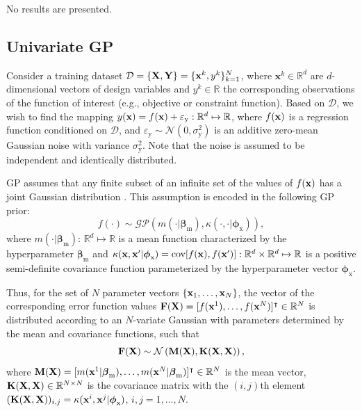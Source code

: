 \documentclass[iicol,sn-basic]{sn-jnl}%
\newcommand{\edit}[1]{\textcolor{red}{#1}} %
\begin{document}
No results are presented.
\begin{appendices}
	
\section{Univariate GP}\label{AppA}
\setcounter{equation}{0} %
\renewcommand{\theequation}{A.\arabic{equation}} %

Consider a training dataset $\mathcal{D}=\left\{ {\bf X},{\bf Y}\right\}=\{{\bf x}^k,y^k\}_{k=1}^N$, where $\textbf{x}^k\in\mathbb{R}^d$ are $d$-dimensional vectors of design variables and $y^k\in\mathbb{R}$ the corresponding observations of the function of interest (e.g., objective or constraint function).
Based on $\mathcal{D}$, we wish to find the mapping $y({\bf x})=f({\bf x}) + \varepsilon_\text{y}: \mathbb{R}^d \mapsto \mathbb{R}$, where $f({\bf x})$ is a regression function conditioned on $\mathcal{D}$, and $\varepsilon_\text{y} \sim \mathcal{N}(0,\sigma^2_\text{y})$ is an additive zero-mean Gaussian noise with variance $\sigma^2_\text{y}$.
Note that the noise is assumed to be independent and identically distributed.

GP assumes that any finite subset of an infinite set of the values of $f({\bf x})$ has a joint Gaussian distribution \citep{Rasmussen2006}.
This assumption is encoded in the following GP prior:
\begin{equation}\label{eqnA1}
	f(\cdot) \sim \mathcal{GP} \left(m(\cdot|\boldsymbol \beta_\text{m}),\kappa(\cdot,\cdot|\boldsymbol \phi_{\text{x}})\right),
\end{equation}
where  $m(\cdot|\boldsymbol \beta_{\text{m}})$: $\mathbb{R}^d \mapsto \mathbb{R}$ is a mean function characterized by the hyperparameter $\boldsymbol \beta_{\text{m}}$ and $\kappa({\bf x},{\bf x}'|\boldsymbol \phi_{\text{x}}) = \text{cov}[f({\bf x}),f({\bf x}')]: \mathbb{R}^d \times \mathbb{R}^d \mapsto \mathbb{R} $ is %
{a positive semi-definite} covariance function parameterized by the hyperparameter vector $\boldsymbol \phi_{\text{x}}$.

Thus, for the set of $N$ parameter vectors $\{{\bf x}_1,\dots,\textbf{x}_N \}$, the vector of the corresponding error function values ${\bf F}({\bf X})=[f({\bf x}^1),\dots,f({\bf x}^N)]^\intercal \in \mathbb{R}^N$ is distributed according to %
{an $N$-variate Gaussian with parameters determined by the mean
and covariance functions, such that}
\begin{equation}\label{eqnA2}
	{\bf F}({\bf X}) \sim \mathcal{N} \left({\bf M}({\bf X}),{\bf K}({\bf X},{\bf X})\right),
\end{equation}
where ${\bf M}({\bf X})=[m({\bf x}^1|\boldsymbol \beta_{\text{m}}),\dots,m({\bf x}^N|\boldsymbol \beta_{\text{m}})]^\intercal \in \mathbb{R}^N$ is the mean vector, ${\bf K}({\bf X},{\bf X}) \in \mathbb{R}^{N \times N}$ is the covariance matrix with the $(i,j)$th element $({\bf K}({\bf X},{\bf X}))_{i,j} = \kappa({\bf x}^i,{\bf x}^j|\boldsymbol \phi_{\text{x}})$, $i,j=1,\dots,N$.


\end{appendices}
\end{document}
